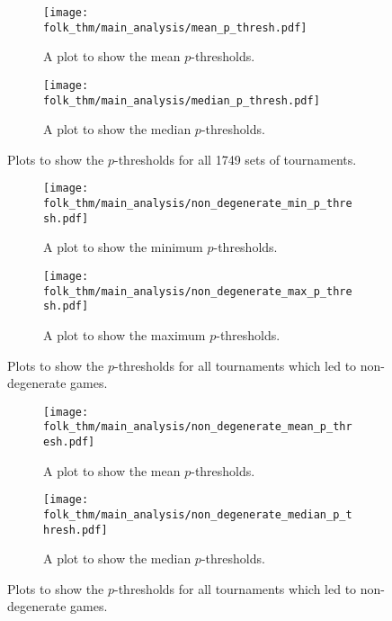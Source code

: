 \begin{figure}
    \begin{subfigure}{.45\textwidth}
        \centering
        \texttt{[image: folk\_thm/main\_analysis/mean\_p\_thresh.pdf]}
        \caption{A plot to show the mean \(p\)-thresholds.}\label{subfig:mean_p_thresh}
    \end{subfigure}
    \begin{subfigure}{.45\textwidth}
        \centering
        \texttt{[image: folk\_thm/main\_analysis/median\_p\_thresh.pdf]}
        \caption{A plot to show the median \(p\)-thresholds.}\label{subfig:median_p_thresh}
    \end{subfigure}
    \caption{Plots to show the \(p\)-thresholds for all 1749 sets of tournaments.}\label{fig:mean_median_p_thresh}
\end{figure}



\begin{figure}
    \begin{subfigure}{.45\textwidth}
        \centering
        \texttt{[image: folk\_thm/main\_analysis/non\_degenerate\_min\_p\_thresh.pdf]}
        \caption{A plot to show the minimum \(p\)-thresholds.}\label{subfig:non_degen_min_p_thresh}
    \end{subfigure}
    \begin{subfigure}{.45\textwidth}
        \centering
        \texttt{[image: folk\_thm/main\_analysis/non\_degenerate\_max\_p\_thresh.pdf]}
        \caption{A plot to show the maximum \(p\)-thresholds.}\label{subfig:non_degen_max_p_thresh}
    \end{subfigure}
    \caption{Plots to show the \(p\)-thresholds for all tournaments which led to non-degenerate games.}\label{fig:non_degen_min_max_p_thresh}
\end{figure}


\begin{figure}
    \begin{subfigure}{.45\textwidth}
        \centering
        \texttt{[image: folk\_thm/main\_analysis/non\_degenerate\_mean\_p\_thresh.pdf]}
        \caption{A plot to show the mean \(p\)-thresholds.}\label{subfig:non_degen_mean_p_thresh}
    \end{subfigure}
    \begin{subfigure}{.45\textwidth}
        \centering
        \texttt{[image: folk\_thm/main\_analysis/non\_degenerate\_median\_p\_thresh.pdf]}
        \caption{A plot to show the median \(p\)-thresholds.}\label{subfig:non_degen_median_p_thresh}
    \end{subfigure}
    \caption{Plots to show the \(p\)-thresholds for all tournaments which led to non-degenerate games.}\label{fig:non_degen_mean_median_p_thresh}
\end{figure}




